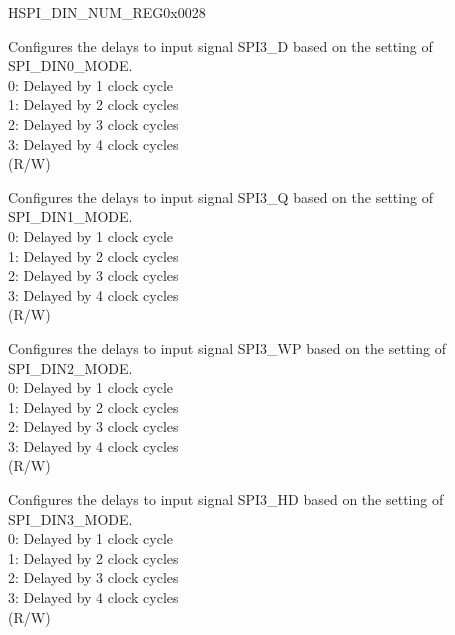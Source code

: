 \begin{register}{H}{SPI\_DIN\_NUM\_REG}{0x0028}\label{regdesc:SPI3DINNUMREG}
%
%
%
%
%
\regnewline%
\begin{regdesc}\begin{reglist}
\label{fielddesc:SPI3DIN0NUM}\item [SPI\_DIN0\_NUM] Configures the delays to input signal SPI3\_D based on the setting of SPI\_DIN0\_MODE.\\
0: Delayed by 1 clock cycle\\
1: Delayed by 2 clock cycles\\
2: Delayed by 3 clock cycles\\
3: Delayed by 4 clock cycles\\
(R/W)
\label{fielddesc:SPI3DIN1NUM}\item [SPI\_DIN1\_NUM] Configures the delays to input signal SPI3\_Q based on the setting of SPI\_DIN1\_MODE.\\
0: Delayed by 1 clock cycle\\
1: Delayed by 2 clock cycles\\
2: Delayed by 3 clock cycles\\
3: Delayed by 4 clock cycles\\
(R/W)
\label{fielddesc:SPI3DIN2NUM}\item [SPI\_DIN2\_NUM] Configures the delays to input signal SPI3\_WP based on the setting of SPI\_DIN2\_MODE.\\
0: Delayed by 1 clock cycle\\
1: Delayed by 2 clock cycles\\
2: Delayed by 3 clock cycles\\
3: Delayed by 4 clock cycles\\
(R/W)
\label{fielddesc:SPI3DIN3NUM}\item [SPI\_DIN3\_NUM] Configures the delays to input signal SPI3\_HD based on the setting of SPI\_DIN3\_MODE.\\
0: Delayed by 1 clock cycle\\
1: Delayed by 2 clock cycles\\
2: Delayed by 3 clock cycles\\
3: Delayed by 4 clock cycles\\
(R/W)
\end{reglist}\end{regdesc}
\end{register}


